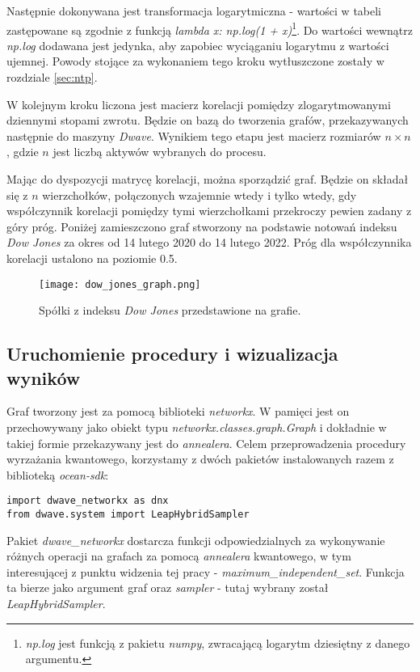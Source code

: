 \documentclass[12pt,a4paper,twoside,openany]{book}
\begin{document}
Następnie dokonywana jest transformacja logarytmiczna - wartości w tabeli zastępowane są zgodnie z funkcją \textit{lambda x: np.log(1 + x)}\footnote{\textit{np.log} jest funkcją z pakietu \textit{numpy}, zwracającą logarytm dziesiętny z danego argumentu.}. Do wartości wewnątrz \textit{np.log} dodawana jest jedynka, aby zapobiec wyciąganiu logarytmu z wartości ujemnej. Powody stojące za wykonaniem tego kroku wytłuszczone zostały w rozdziale \ref{sec:ntp}.

W kolejnym kroku liczona jest macierz korelacji pomiędzy zlogarytmowanymi dziennymi stopami zwrotu.
Będzie on bazą do tworzenia grafów, przekazywanych następnie do maszyny \textit{Dwave}.
Wynikiem tego etapu jest macierz rozmiarów $n \times n$, gdzie $n$ jest liczbą aktywów wybranych do procesu.

Mając do dyspozycji matrycę korelacji, można sporządzić graf.
Będzie on składał się z $n$ wierzchołków, połączonych wzajemnie wtedy i tylko wtedy, gdy współczynnik korelacji pomiędzy tymi wierzchołkami przekroczy pewien zadany z góry próg.
Poniżej zamieszczono graf stworzony na podstawie notowań indeksu \textit{Dow Jones} za okres od 14 lutego 2020 do 14 lutego 2022. 
Próg dla współczynnika korelacji ustalono na poziomie 0.5.

\begin{figure}[h!]
\texttt{[image: dow\_jones\_graph.png]}
\caption{Spółki z indeksu \textit{Dow Jones} przedstawione na grafie.}
\label{fig:dow-jones-graph}
\end{figure}


\subsection{Uruchomienie procedury i wizualizacja wyników}

Graf tworzony jest za pomocą biblioteki \textit{networkx}. 
W pamięci jest on przechowywany jako obiekt typu \textit{networkx.classes.graph.Graph} i dokładnie w takiej formie przekazywany jest do \textit{annealera}.
Celem przeprowadzenia procedury wyrzażania kwantowego, korzystamy z dwóch pakietów instalowanych razem z biblioteką \textit{ocean-sdk}:

\begin{verbatim}
import dwave_networkx as dnx
from dwave.system import LeapHybridSampler
\end{verbatim}

Pakiet \textit{dwave\_networkx} dostarcza funkcji odpowiedzialnych za wykonywanie różnych operacji na grafach za pomocą \textit{annealera} kwantowego, w tym interesującej z punktu widzenia tej pracy - \textit{maximum\_independent\_set}.
Funkcja ta bierze jako argument graf oraz \textit{sampler} - tutaj wybrany został \textit{LeapHybridSampler}.
\end{document}
